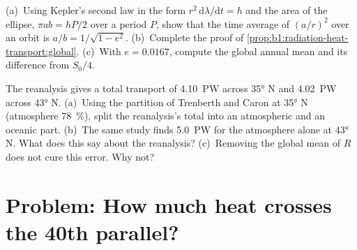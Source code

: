 \begin{exercise}[$\star\star\star$]\label{exo:b1:radiation-heat-transport:11}
(a)~Using Kepler's second law in the form $r^2\,\mathrm d\lambda/\mathrm dt = h$
and the area of the ellipse, $\pi a b = hP/2$ over a period $P$, show that the time
average of $(a/r)^2$ over an orbit is $a/b = 1/\sqrt{1 - e^2}$. (b)~Complete the
proof of \cref{prop:b1:radiation-heat-transport:global}. (c)~With $e = 0.0167$,
compute the global annual mean and its difference from $S_0/4$.
\end{exercise}

\begin{exercise}[$\star\star\star$]\label{exo:b1:radiation-heat-transport:12}
The reanalysis gives a total transport of \qty{4.10}{PW} across \ang{35} N and
\qty{4.02}{PW} across \ang{43} N. (a)~Using the partition of Trenberth and Caron at
\ang{35} N (atmosphere \qty{78}{\percent}), split the reanalysis's total into an
atmospheric and an oceanic part. (b)~The same study finds \qty{5.0}{PW} for
the atmosphere alone at \ang{43} N. What does this say about the reanalysis?
(c)~Removing the global mean of $R$ does not cure this error. Why not?
\end{exercise}

\section{Problem: How much heat crosses the 40th parallel?}

